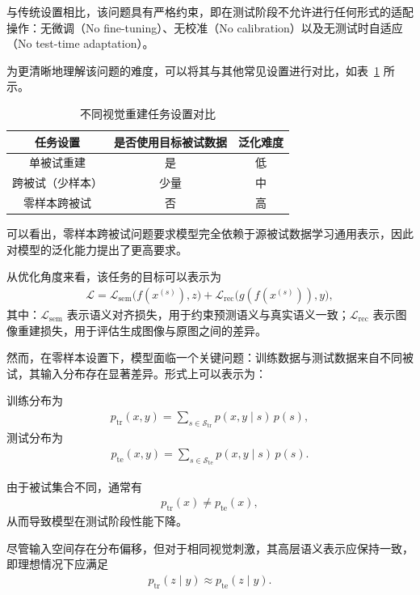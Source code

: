 与传统设置相比，该问题具有严格约束，即在测试阶段不允许进行任何形式的适配操作：无微调（No fine-tuning）、无校准（No calibration）以及无测试时自适应（No test-time adaptation）。

为更清晰地理解该问题的难度，可以将其与其他常见设置进行对比，如表~\ref{tab:task_compare} 所示。

\begin{table}[htbp]
  \centering
  \caption{不同视觉重建任务设置对比}
  \label{tab:task_compare}
  \begin{tabular}{ccc}
    \toprule
    任务设置 & 是否使用目标被试数据 & 泛化难度 \\
    \midrule
    单被试重建 & 是 & 低 \\
    跨被试（少样本） & 少量 & 中 \\
    零样本跨被试 & 否 & 高 \\
    \bottomrule
  \end{tabular}
\end{table}

可以看出，零样本跨被试问题要求模型完全依赖于源被试数据学习通用表示，因此对模型的泛化能力提出了更高要求。

从优化角度来看，该任务的目标可以表示为
\begin{align}
  \mathcal{L} = \mathcal{L}_{\mathrm{sem}}\bigl(f(x^{(s)}), z\bigr) + \mathcal{L}_{\mathrm{rec}}\bigl(g(f(x^{(s)})), y\bigr),
\end{align}
其中：$\mathcal{L}_{\mathrm{sem}}$ 表示语义对齐损失，用于约束预测语义与真实语义一致；$\mathcal{L}_{\mathrm{rec}}$ 表示图像重建损失，用于评估生成图像与原图之间的差异。

然而，在零样本设置下，模型面临一个关键问题：训练数据与测试数据来自不同被试，其输入分布存在显著差异。形式上可以表示为：

训练分布为
\begin{align}
  p_{\mathrm{tr}}(x,y) = \sum_{s \in \mathcal{S}_{\mathrm{tr}}} p(x,y \mid s) \, p(s),
\end{align}
测试分布为
\begin{align}
  p_{\mathrm{te}}(x,y) = \sum_{s \in \mathcal{S}_{\mathrm{te}}} p(x,y \mid s) \, p(s).
\end{align}

由于被试集合不同，通常有
\begin{align}
  p_{\mathrm{tr}}(x) \neq p_{\mathrm{te}}(x),
\end{align}
从而导致模型在测试阶段性能下降。

尽管输入空间存在分布偏移，但对于相同视觉刺激，其高层语义表示应保持一致，即理想情况下应满足
\begin{align}
  p_{\mathrm{tr}}(z \mid y) \approx p_{\mathrm{te}}(z \mid y).
\end{align}

